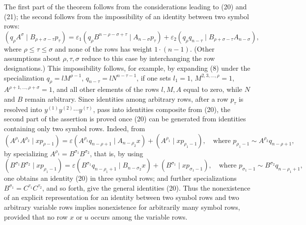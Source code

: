\documentclass[10pt]{article}
\newcommand{\pair}[2]{(#1\mid #2)}
\newcommand{\eps}{\varepsilon}
\begin{document}
The first part of the theorem follows from the considerations leading to (20) and (21); the second follows from the impossibility of an identity between two symbol rows:
\[
\pair{q_\rho A^\sigma}{B_{\rho+\sigma-\tau}p_\tau}
=\eps_1\pair{q_\rho B^{n-\rho-\sigma+\tau}}{A_{n-\sigma}p_\tau}
+\eps_2\pair{q_\rho q_{n-\tau}}{B_{\rho+\sigma-\tau}A_{n-\sigma}},
\]
where $\rho\le\tau\le\sigma$ and none of the rows has weight $1\cdot(n-1)$. (Other assumptions about $\rho,\tau,\sigma$ reduce to this case by interchanging the row designations.) This impossibility follows, for example, by expanding (8) under the specialization $q_\rho=lM^{\rho-1}$, $q_{n-\tau}=lN^{n-\tau-1}$, if one sets $l_1=1$, $M^{2,3,\ldots,\rho}=1$, $A^{\rho+1,\ldots,\rho+\sigma}=1$, and all other elements of the rows $l,M,A$ equal to zero, while $N$ and $B$ remain arbitrary. Since identities among arbitrary rows, after a row $p_\tau$ is resolved into $y^{(1)}y^{(2)}\cdots y^{(\tau)}$, pass into identities composite from (20), the second part of the assertion is proved once (20) can be generated from identities containing only two symbol rows. Indeed, from
\begin{equation}
\pair{A^{\rho_1}A^{\rho_2}}{xp_{\rho-1}}
=\eps\pair{A^{\rho_1}q_{n-\rho+1}}{A_{n-\rho_2}x}
+\pair{A^{\rho_1}}{xp_{\rho_1-1}},
\quad \text{where }p_{\rho_1-1}\sim A^{\rho_2}q_{n-\rho+1},
\tag{20a}
\end{equation}
by specializing $A^{\rho_1}=B^{\sigma_1}B^{\sigma_2}$, that is, by using
\[
\pair{B^{\sigma_1}B^{\sigma_2}}{xp_{\rho_1-1}}
=\eps\pair{B^{\sigma_1}q_{n-\rho_1+1}}{B_{n-\sigma_2}x}
+\pair{B^{\sigma_1}}{xp_{\sigma_1-1}},
\quad \text{where }p_{\sigma_1-1}\sim B^{\sigma_2}q_{n-\rho_1+1},
\]
one obtains an identity (20) in three symbol rows; and further specializations $B^{\sigma_1}=C^{\tau_1}C^{\tau_2}$, and so forth, give the general identities (20). Thus the nonexistence of an explicit representation for an identity between two symbol rows and two arbitrary variable rows implies nonexistence for arbitrarily many symbol rows, provided that no row $x$ or $u$ occurs among the variable rows.
\end{document}
